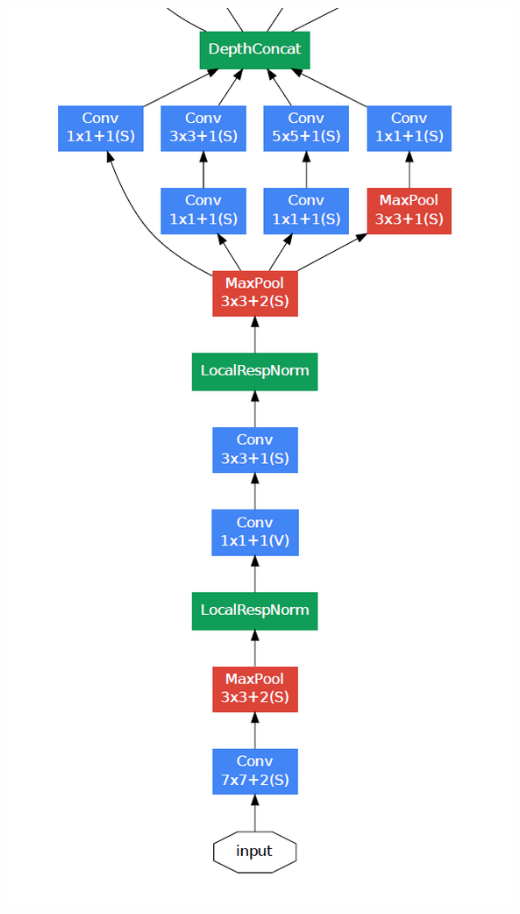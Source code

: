 \begin{frame}[allowframebreaks]
\begin{columns}
			\begin{column}{.2\textwidth}
			\begin{center}
				\includegraphics[scale=0.5]{figs/GoogleNet_scheme_2}
			\end{center}
		\end{column}%


\end{columns}
\end{frame}
